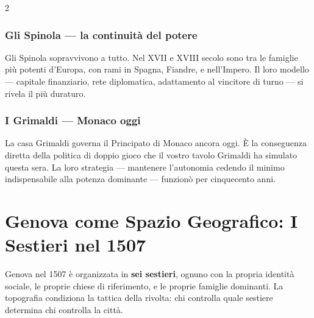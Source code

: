 \begin{multicols}{2}
\subsubsection{Gli Spinola — la continuità del potere}

Gli Spinola sopravvivono a tutto. Nel XVII e XVIII secolo sono tra
le famiglie più potenti d'Europa, con rami in Spagna, Fiandre, e
nell'Impero. Il loro modello — capitale finanziario, rete diplomatica,
adattamento al vincitore di turno — si rivela il più duraturo.

\subsubsection{I Grimaldi — Monaco oggi}


La casa Grimaldi governa il Principato di Monaco ancora oggi. È la
conseguenza diretta della politica di doppio gioco che il vostro
tavolo Grimaldi ha simulato questa sera. La loro strategia — mantenere
l'autonomia cedendo il minimo indispensabile alla potenza dominante —
funzionò per cinquecento anni.

\end{multicols}

\section{Genova come Spazio Geografico: I Sestieri nel 1507}
\label{sec:geografia}


Genova nel 1507 è organizzata in \textbf{sei sestieri}, ognuno con la
propria identità sociale, le proprie chiese di riferimento, e le proprie
famiglie dominanti. La topografia condiziona la tattica della rivolta:
chi controlla quale sestiere determina chi controlla la città.

